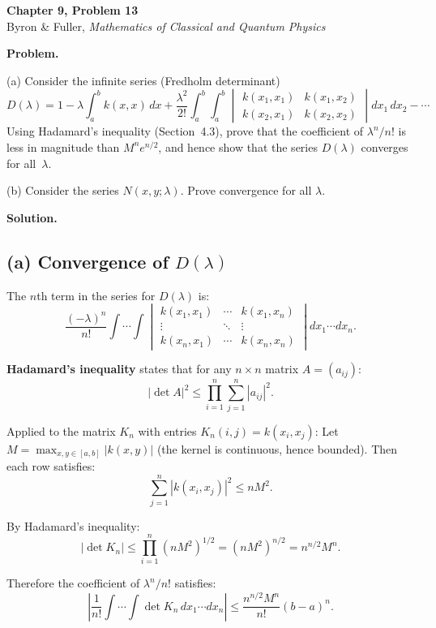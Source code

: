 \documentclass[12pt]{article}
\begin{document}
\begin{center}
{\Large\bfseries Chapter 9, Problem 13}\\[6pt]
Byron \& Fuller, \textit{Mathematics of Classical and Quantum Physics}
\end{center}

\bigskip

\textbf{Problem.}

(a) Consider the infinite series (Fredholm determinant)
\[
D(\lambda) = 1 - \lambda\int_a^b k(x,x)\,dx + \frac{\lambda^2}{2!}\int_a^b\!\!\int_a^b \begin{vmatrix} k(x_1,x_1) & k(x_1,x_2) \\ k(x_2,x_1) & k(x_2,x_2) \end{vmatrix} dx_1\,dx_2 - \cdots
\]
Using Hadamard's inequality (Section~4.3), prove that the coefficient of $\lambda^n/n!$ is less in magnitude than $M^n e^{n/2}$, and hence show that the series $D(\lambda)$ converges for all~$\lambda$.

(b) Consider the series $N(x,y;\lambda)$. Prove convergence for all $\lambda$.

\bigskip
\textbf{Solution.}

\subsection*{(a) Convergence of $D(\lambda)$}

The $n$th term in the series for $D(\lambda)$ is:
\[
\frac{(-\lambda)^n}{n!}\int\cdots\int \begin{vmatrix} k(x_1,x_1) & \cdots & k(x_1,x_n) \\ \vdots & \ddots & \vdots \\ k(x_n,x_1) & \cdots & k(x_n,x_n) \end{vmatrix} dx_1\cdots dx_n.
\]

\textbf{Hadamard's inequality} states that for any $n \times n$ matrix $A = (a_{ij})$:
\[
|\det A|^2 \le \prod_{i=1}^n \sum_{j=1}^n |a_{ij}|^2.
\]

Applied to the matrix $K_n$ with entries $K_n(i,j) = k(x_i, x_j)$: Let $M = \max_{x,y \in [a,b]} |k(x,y)|$ (the kernel is continuous, hence bounded). Then each row satisfies:
\[
\sum_{j=1}^n |k(x_i, x_j)|^2 \le n M^2.
\]

By Hadamard's inequality:
\[
|\det K_n| \le \prod_{i=1}^n (nM^2)^{1/2} = (nM^2)^{n/2} = n^{n/2}M^n.
\]

Therefore the coefficient of $\lambda^n/n!$ satisfies:
\[
\left|\frac{1}{n!}\int\cdots\int \det K_n\,dx_1\cdots dx_n\right| \le \frac{n^{n/2}M^n}{n!}(b-a)^n.
\]
\end{document}

